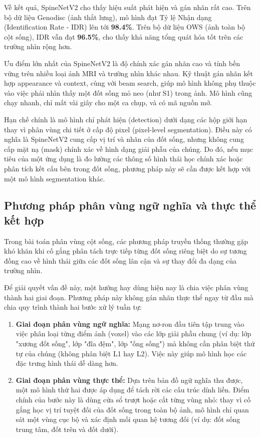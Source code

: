 Về kết quả, SpineNetV2 cho thấy hiệu suất phát hiện và gán nhãn rất cao. Trên bộ dữ liệu Genodisc (ảnh thắt lưng), mô hình đạt Tỷ lệ Nhận dạng (Identification Rate - IDR) lên tới \textbf{98.4\%}. Trên bộ dữ liệu OWS (ảnh toàn bộ cột sống), IDR vẫn đạt \textbf{96.5\%}, cho thấy khả năng tổng quát hóa tốt trên các trường nhìn rộng hơn.

Ưu điểm lớn nhất của SpineNetV2 là độ chính xác gán nhãn cao và tính bền vững trên nhiều loại ảnh MRI và trường nhìn khác nhau. Kỹ thuật gán nhãn kết hợp appearance và context, cùng với beam search, giúp mô hình không phụ thuộc vào việc phải nhìn thấy một đốt sống mỏ neo (như S1) trong ảnh. Mô hình cũng chạy nhanh, chỉ mất vài giây cho một ca chụp, và có mã nguồn mở.

Hạn chế chính là mô hình chỉ phát hiện (detection) dưới dạng các hộp giới hạn thay vì phân vùng chi tiết ở cấp độ pixel (pixel-level segmentation). Điều này có nghĩa là SpineNetV2 cung cấp vị trí và nhãn của đốt sống, nhưng không cung cấp mặt nạ (mask) chính xác về hình dạng giải phẫu của chúng. Do đó, nếu mục tiêu của một ứng dụng là đo lường các thông số hình thái học chính xác hoặc phân tích kết cấu bên trong đốt sống, phương pháp này sẽ cần được kết hợp với một mô hình segmentation khác.

\subsection{Phương pháp phân vùng ngữ nghĩa và thực thể kết hợp}
\label{subsec:seg_concept}

Trong bài toán phân vùng cột sống, các phương pháp truyền thống thường gặp khó khăn khi cố gắng phân tách trực tiếp từng đốt sống riêng biệt do sự tương đồng cao về hình thái giữa các đốt sống lân cận và sự thay đổi đa dạng của trường nhìn.

Để giải quyết vấn đề này, một hướng hay dùng hiện nay là chia việc phân vùng thành hai giai đoạn. Phương pháp này không gán nhãn thực thể ngay từ đầu mà chia quy trình thành hai bước xử lý tuần tự:

\begin{enumerate}
    \item \textbf{Giai đoạn phân vùng ngữ nghĩa:} 
    Mạng nơ-ron đầu tiên tập trung vào việc phân loại từng điểm ảnh (voxel) vào các lớp giải phẫu chung (ví dụ: lớp "xương đốt sống", lớp "đĩa đệm", lớp "ống sống") mà không cần phân biệt thứ tự của chúng (không phân biệt L1 hay L2). Việc này giúp mô hình học các đặc trưng hình thái dễ dàng hơn.

    \item \textbf{Giai đoạn phân vùng thực thể:}
    Dựa trên bản đồ ngữ nghĩa thu được, một mô hình thứ hai được áp dụng để tách rời các cấu trúc dính liền. Điểm chính của bước này là dùng cửa sổ trượt hoặc cắt từng vùng nhỏ: thay vì cố gắng học vị trí tuyệt đối của đốt sống trong toàn bộ ảnh, mô hình chỉ quan sát một vùng cục bộ và xác định mối quan hệ tương đối (ví dụ: đốt sống trung tâm, đốt trên và đốt dưới).
\end{enumerate}

